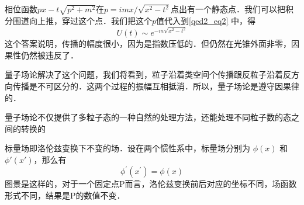 相位函数$px-t\sqrt{p^2+m^2}$在$p=imx/\sqrt{x^2-t^2}$点出有一个静态点．我们可以把积分围道向上推，穿过这个点．我们把这个$p$值代入到\autoref{qed2_eq2} 中，得
\begin{equation}
U(t)\sim e^{-m\sqrt{x^2-t^2}}
\end{equation}
这个答案说明，传播的幅度很小，因为是指数压低的．但仍然在光锥外面非零，因果性仍然被违反了．

量子场论解决了这个问题，我们将看到，粒子沿着类空间个传播跟反粒子沿着反方向传播是不可区分的．这两个过程的振幅互相抵消．所以，量子场论是遵守因果律的．

量子场论不仅提供了多粒子态的一种自然的处理方法，还能处理不同粒子数的态之间的转换的

\begin{definition}{}
标量场即洛伦兹变换下不变的场．设在两个惯性系中，标量场分别为 $\phi(x)$ 和 $\phi'(x')$，那么有
\begin{equation}
\phi^{\prime}\left(x^{\prime}\right)=\phi(x)
\end{equation}
图景是这样的，对于一个固定点P而言，洛伦兹变换前后对应的坐标不同，场函数形式不同，结果是P的数值不变．
\end{definition}
